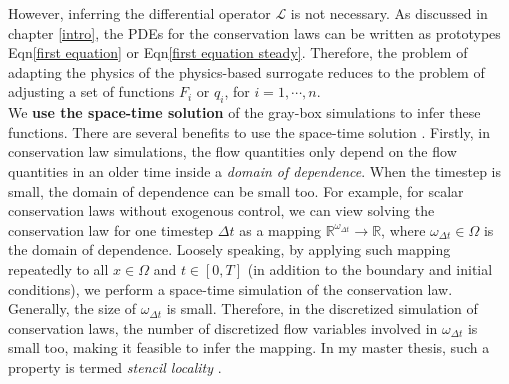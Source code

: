 \documentclass[a4paper,onecolumn]{article}
\theoremstyle{remark}
\begin{document}
\noindent However, inferring the differential operator $\mathcal{L}$ 
is not necessary. As discussed in
chapter \ref{intro}, 
the PDEs for the conservation laws can be written as prototypes Eqn\eqref{first equation}
or Eqn\eqref{first equation steady}.
Therefore, the problem of adapting the physics of the physics-based surrogate reduces to the
problem of adjusting a set of functions $F_i$ or
$q_i$, for $i=1,\cdots,n$. \\



\noindent We \textbf{use the space-time solution} of the gray-box simulations 
to infer these functions.
There are several benefits to use the space-time solution \cite{hanmaster}.
Firstly, in conservation law simulations, the flow quantities only depend on the flow
quantities in an older time inside a \emph{domain of dependence}.
When the timestep is small,
the domain of dependence can be small too. For example, for scalar conservation laws 
without exogenous control,
we can view solving the conservation law for one timestep $\Delta t$ as a mapping 
$\mathbb{R}^{\omega_{\Delta t}} \rightarrow \mathbb{R}$, where $\omega_{\Delta t}\in \Omega$ 
is the domain of dependence. 
Loosely speaking, by applying such mapping repeatedly to all $x\in \Omega$ and $t\in[0,T]$
(in addition to the boundary and initial conditions), we perform 
a space-time simulation of the conservation law. 
Generally, the size of $\omega_{\Delta t}$ is small.
Therefore, in the discretized simulation of conservation laws,
the number of discretized flow variables involved in $\omega_{\Delta t}$ is small too,
making it feasible to infer the mapping.
In my master thesis, such a property is termed \emph{stencil locality} \cite{hanmaster}.
\\
\end{document}
